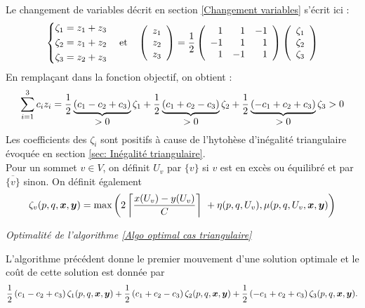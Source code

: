 Le changement de variables décrit en section \ref{Changement variables} s'écrit ici :
\begin{equation}\notag
  \left\{
    \begin{aligned}
      \zeta_1 &= z_1 + z_3 \\
      \zeta_2 &= z_1 + z_2 \\
      \zeta_3 &= z_2 + z_3
    \end{aligned}
  \right.
  \quad \mbox{et} \quad
  \left(
    \begin{array}{c}
      z_1 \\
      z_2 \\
      z_3
    \end{array}
  \right)
  = \frac{1}{2}
  \left(
    \begin{array}{rrr}
      1 & 1 & -1 \\
      -1 & 1 & 1 \\
      1 & -1 & 1
    \end{array}
  \right)
  \left(
    \begin{array}{c}
      \zeta_1 \\
      \zeta_2 \\
      \zeta_3
    \end{array}
  \right)
\end{equation}
En remplaçant dans la fonction objectif, on obtient :
\begin{equation}\notag
  \sum_{i=1}^3c_iz_i =
    \frac{1}{2} \underbrace{ \left(c_1 - c_2 + c_3 \right) }_{\displaystyle >0} \zeta_1
  + \frac{1}{2} \underbrace{ \left(c_1 + c_2 - c_3 \right) }_{\displaystyle >0} \zeta_2
  + \frac{1}{2} \underbrace{ \left(-c_1 + c_2 + c_3\right) }_{\displaystyle >0} \zeta_3 >0
\end{equation}
Les coefficients des $\zeta_i$ sont positifs à cause de l'hytohèse d'inégalité triangulaire évoquée en section \ref{sec: Inégalité triangulaire}.
\\

Pour un sommet $v \in V$, on définit $U_v$ par $\{v\}$ si $v$ est en excès ou équilibré et par $\overline{\{v\}}$ sinon. On définit également
\[
\zeta_v(p,q,\boldsymbol{x},\boldsymbol{y}) = \mbox{max} \left( 2 \left\lceil \frac{x(U_v)-y(U_v)}{C} \right\rceil\ + \eta(p,q,U_v), \mu(p,q,U_v,\boldsymbol{x},\boldsymbol{y}) \right)
\]

\begin{thm}\label{Optimalite algo graphe triangulaire}
\emph{Optimalité de l'algorithme \ref{Algo optimal cas triangulaire}}

L'algorithme précédent donne le premier mouvement d'une solution optimale et le coût de cette solution est donnée par
\[
\frac{1}{2} \left(c_1 - c_2 + c_3 \right) \zeta_1(p,q,\boldsymbol{x},\boldsymbol{y})
+ \frac{1}{2} \left(c_1 + c_2 - c_3 \right) \zeta_2(p,q,\boldsymbol{x},\boldsymbol{y})
+ \frac{1}{2} \left(-c_1 + c_2 + c_3\right) \zeta_3(p,q,\boldsymbol{x},\boldsymbol{y}).
\]
\end{thm}

